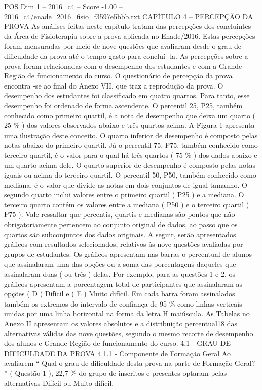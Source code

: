 \begin{textsample}{POS Dim 1 – 2016\_c4 – Score -1.00 – 2016\_c4/enade\_2016\_fisio\_f3597e5bbb.txt}  \label{ex:f1_pos_281}
CAPÍTULO 4 – PERCEPÇÃO DA PROVA As análises feitas neste capítulo tratam das percepções dos concluintes da Área de Fisioterapia sobre a prova aplicada no Enade/2016.
Estas percepções foram mensuradas por meio de nove questões que avaliaram desde o grau de dificuldade da prova até o tempo gasto para concluí -la.
As percepções sobre a prova foram relacionadas com o desempenho dos estudantes e com a Grande Região de funcionamento do curso.
O questionário de percepção da prova encontra -se ao final do Anexo VII, que traz a reprodução da prova.
O desempenho dos estudantes foi classificado em quatro quartos.
Para tanto, esse desempenho foi ordenado de forma ascendente.
O percentil 25, P25, também conhecido como primeiro quartil, é a nota de desempenho que deixa um quarto ( 25 \% ) dos valores observados abaixo e três quartos acima.
A Figura 1 apresenta uma ilustração deste conceito.
O quarto inferior de desempenho é composto pelas notas abaixo do primeiro quartil.
Já o percentil 75, P75, também conhecido como terceiro quartil, é o valor para o qual há três quartos ( 75 \% ) dos dados abaixo e um quarto acima dele.
O quarto superior de desempenho é composto pelas notas iguais ou acima do terceiro quartil.
O percentil 50, P50, também conhecido como mediana, é o valor que divide as notas em dois conjuntos de igual tamanho.
O segundo quarto inclui valores entre o primeiro quartil ( P25 ) e a mediana.
O terceiro quarto contém os valores entre a mediana ( P50 ) e o terceiro quartil ( P75 ).
Vale ressaltar que percentis, quartis e medianas são pontos que não obrigatoriamente pertencem ao conjunto original de dados, ao passo que os quartos são subconjuntos dos dados originais.
A seguir, serão apresentados gráficos com resultados selecionados, relativos às nove questões avaliadas por grupos de estudantes.
Os gráficos apresentam nas barras o percentual de alunos que assinalaram uma das opções ou a soma das porcentagens daqueles que assinalaram duas ( ou três ) delas.
Por exemplo, para as questões 1 e 2, os gráficos apresentam a porcentagem total de participantes que assinalaram as opções ( D ) Difícil e ( E ) Muito difícil.
Em cada barra foram assinalados também os extremos do intervalo de confiança de 95 \% como linhas verticais unidas por uma linha horizontal na forma da letra H maiúscula.
As Tabelas no Anexo II apresentam os valores absolutos e a distribuição percentual18 das alternativas válidas das nove questões, segundo o mesmo recorte de desempenho dos alunos e Grande Região de funcionamento do curso. 4.1 - GRAU DE DIFICULDADE DA PROVA 4.1.1 - Componente de Formação Geral Ao avaliarem “ Qual o grau de dificuldade desta prova na parte de Formação Geral? ” ( Questão 1 ), 22,7 \% do grupo de inscritos e presentes optaram pelas alternativas Difícil ou Muito difícil.

\end{textsample}
